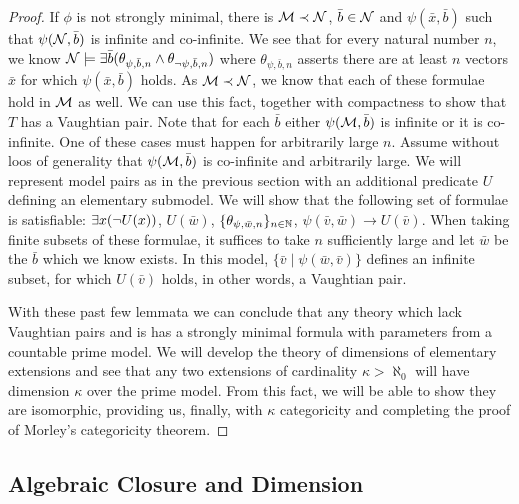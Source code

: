 \begin{proof}
If \(\phi\) is not strongly minimal, there is \(\mathcal{M} \prec \mathcal{N}\), \(\bar{b} \in \mathcal{N}\) and \(\psi(\bar{x}, \bar{b})\) such that \(\psi(\mathcal{N}, \bar{b})\) is infinite and co-infinite. 
We see that for every natural number \(n\), we know \(\mathcal{N} \models \exists \bar{b} (\theta_{\psi, \bar{b}, n} \land \theta_{\neg \psi, \bar{b}, n})\) where \(\theta_{\psi, \bar{b},n}\) asserts there are at least \(n\) vectors \(\bar{x}\) for which \(\psi(\bar{x}, \bar{b})\) holds. 
As \(\mathcal{M} \prec \mathcal{N}\), we know that each of these formulae hold in \(\mathcal{M}\) as well. 
We can use this fact, together with compactness to show that \(T\) has a Vaughtian pair.
Note that for each \(\bar{b}\) either \(\psi(\mathcal{M}, \bar{b})\) is infinite or it is co-infinite. 
One of these cases must happen for arbitrarily large \(n\).  %
Assume without loos of generality that \(\psi(\mathcal{M}, \bar{b})\) is co-infinite and arbitrarily large. 
We will represent model pairs as in the previous section with an additional predicate \(U\) defining an elementary submodel. 
We will show that the following set of formulae is satisfiable: 
\(\exists x (\neg U(x))\), \(U(\bar{w})\), \(\{\theta_{\psi, \bar{w}, n}\}_{n\in \mathbb{N}}\), \(\psi(\bar{v}, \bar{w}) \to U(\bar{v})\). 
When taking finite subsets of these formulae, it suffices to take \(n\) sufficiently large and let \(\bar{w}\) be the \(\bar{b}\) which we know exists.
In this model, \(\{\bar{v}\mid\psi(\bar{w}, \bar{v})\}\) defines an infinite subset, for which \(U(\bar{v})\) holds, in other words, a Vaughtian pair. %

With these past few lemmata we can conclude that any theory which lack Vaughtian pairs and is \omst has a strongly minimal formula with parameters from a countable prime model. 
We will develop the theory of dimensions of elementary extensions and see that any two extensions of cardinality \(\kappa > \aleph_0\) will have dimension \(\kappa\) over the prime model.
From this fact, we will be able to show they are isomorphic, providing us, finally, with \(\kappa\) categoricity and completing the proof of Morley's categoricity theorem. 
\end{proof}

\subsection{Algebraic Closure and Dimension}


